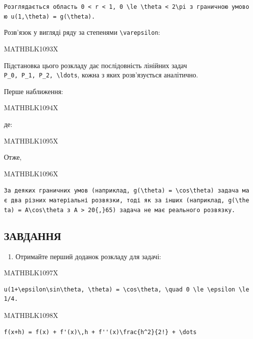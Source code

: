 \documentclass[
  ukrainian,
]{article}
\providecommand{\tightlist}{%
  \setlength{\itemsep}{0pt}\setlength{\parskip}{0pt}}
\begin{document}
\texttt{Розглядається\ область\ \textquotesingle{}0\ \textless{}\ r\ \textless{}\ 1\textquotesingle{},\ \textquotesingle{}0\ \textbackslash{}le\ \textbackslash{}theta\ \textless{}\ 2\textbackslash{}pi\textquotesingle{}\ з\ граничною\ умовою\ \textquotesingle{}u(1,\textbackslash{}theta)\ =\ g(\textbackslash{}theta)\textquotesingle{}.}

Розв'язок у вигляді ряду за степенями
\texttt{\textbackslash{}varepsilon}:

MATHBLK1093X

Підстановка цього розкладу дає послідовність лінійних задач
\texttt{P\_0,\ P\_1,\ P\_2,\ \textbackslash{}ldots}, кожна з яких
розв'язується аналітично.

Перше наближення:

MATHBLK1094X

де:

MATHBLK1095X

Отже,

MATHBLK1096X

\texttt{За\ деяких\ граничних\ умов\ (наприклад,\ \textquotesingle{}g(\textbackslash{}theta)\ =\ \textbackslash{}cos\textbackslash{}theta\textquotesingle{})\ задача\ має\ два\ різних\ матеріальні\ розв\textquotesingle{}язки,\ тоді\ як\ за\ інших\ (наприклад,\ \textquotesingle{}g(\textbackslash{}theta)\ =\ A\textbackslash{}cos\textbackslash{}theta\textquotesingle{}\ з\ \textquotesingle{}A\ \textgreater{}\ 20\{,\}65\textquotesingle{})\ задача\ не\ має\ реального\ розв\textquotesingle{}язку.}

\subsection{ЗАВДАННЯ}\label{ux437ux430ux432ux434ux430ux43dux43dux44f-7}

\begin{enumerate}
\def\labelenumi{\arabic{enumi}.}
\tightlist
\item
  Отримайте перший доданок розкладу для задачі:
\end{enumerate}

MATHBLK1097X

\begin{verbatim}
u(1+\epsilon\sin\theta, \theta) = \cos\theta, \quad 0 \le \epsilon \le 1/4.
\end{verbatim}

MATHBLK1098X

\begin{verbatim}
f(x+h) = f(x) + f'(x)\,h + f''(x)\frac{h^2}{2!} + \dots
\end{verbatim}
\end{document}
